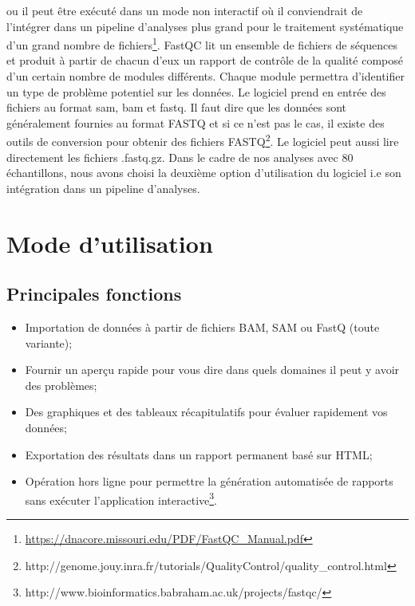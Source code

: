 \documentclass[a4paper,11pt]{article}
\begin{document}
ou il peut être exécuté dans un mode non interactif où il conviendrait
de l’intégrer dans un pipeline d’analyses plus grand pour le
traitement systématique d’un grand nombre de
fichiers\footnote{\url{https://dnacore.missouri.edu/PDF/FastQC_Manual.pdf}}.
FastQC lit un ensemble de fichiers de séquences et produit à partir de
chacun d'eux un rapport de contrôle de la qualité composé d'un certain
nombre de modules différents. Chaque module permettra d'identifier un
type de problème potentiel sur les données. Le logiciel prend en
entrée des fichiers au format sam, bam et fastq. Il faut dire que les
données sont généralement fournies au format FASTQ et si ce n'est pas
le cas, il existe des outils de conversion pour obtenir des fichiers
FASTQ\footnote{{http://genome.jouy.inra.fr/tutorials/QualityControl/quality_control.html}}. Le
logiciel peut aussi lire directement les fichiers .fastq.gz.  Dans le
cadre de nos analyses avec 80 échantillons, nous avons choisi la
deuxième option d'utilisation du logiciel i.e son intégration dans un
pipeline d'analyses.

\section{Mode d'utilisation}

\subsection{Principales fonctions}

\begin{itemize}
  \item Importation de données à partir de fichiers BAM, SAM ou FastQ
    (toute variante);
   \item Fournir un aperçu rapide pour vous dire dans quels domaines
     il peut y avoir des problèmes;
    \item Des graphiques et des tableaux récapitulatifs pour évaluer
      rapidement vos données;
     \item Exportation des résultats dans un rapport permanent basé
       sur HTML;
      \item Opération hors ligne pour permettre la génération
        automatisée de rapports sans exécuter l'application
        interactive\footnote{http://www.bioinformatics.babraham.ac.uk/projects/fastqc/}.
\end{itemize}
\end{document}
